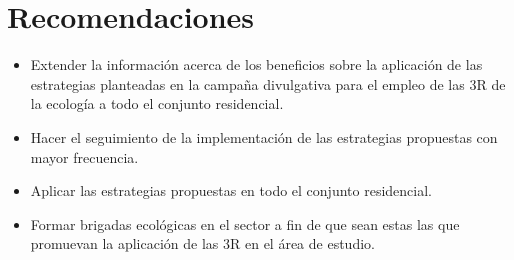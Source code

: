 \newpage

{\setlength{\parskip}{0cm}
\section{Recomendaciones}

\begin{itemize}
    \item Extender la información acerca de los beneficios sobre la aplicación de las estrategias planteadas en la campaña divulgativa para el empleo de las 3R de la ecología a todo el conjunto residencial. 
    
    \item Hacer el seguimiento de la implementación de las estrategias propuestas con mayor frecuencia.

    \item Aplicar las estrategias propuestas en todo el conjunto residencial.
    
    \item Formar brigadas ecológicas en el sector a fin de que sean estas las que promuevan la aplicación de las 3R en el área de estudio.
\end{itemize}
}

\newpage